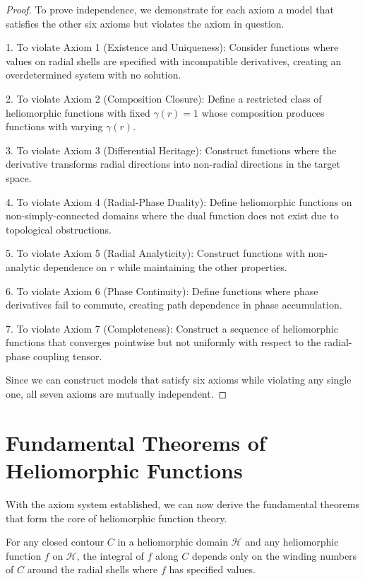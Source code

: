 \begin{proof}
To prove independence, we demonstrate for each axiom a model that satisfies the other six axioms but violates the axiom in question.

1. To violate Axiom 1 (Existence and Uniqueness): Consider functions where values on radial shells are specified with incompatible derivatives, creating an overdetermined system with no solution.

2. To violate Axiom 2 (Composition Closure): Define a restricted class of heliomorphic functions with fixed $\gamma(r) = 1$ whose composition produces functions with varying $\gamma(r)$.

3. To violate Axiom 3 (Differential Heritage): Construct functions where the derivative transforms radial directions into non-radial directions in the target space.

4. To violate Axiom 4 (Radial-Phase Duality): Define heliomorphic functions on non-simply-connected domains where the dual function does not exist due to topological obstructions.

5. To violate Axiom 5 (Radial Analyticity): Construct functions with non-analytic dependence on $r$ while maintaining the other properties.

6. To violate Axiom 6 (Phase Continuity): Define functions where phase derivatives fail to commute, creating path dependence in phase accumulation.

7. To violate Axiom 7 (Completeness): Construct a sequence of heliomorphic functions that converges pointwise but not uniformly with respect to the radial-phase coupling tensor.

Since we can construct models that satisfy six axioms while violating any single one, all seven axioms are mutually independent.
\end{proof}

\section{Fundamental Theorems of Heliomorphic Functions}

With the axiom system established, we can now derive the fundamental theorems that form the core of heliomorphic function theory.

\begin{theorem}
For any closed contour $C$ in a heliomorphic domain $\mathcal{H}$ and any heliomorphic function $f$ on $\mathcal{H}$, the integral of $f$ along $C$ depends only on the winding numbers of $C$ around the radial shells where $f$ has specified values.
\end{theorem}

